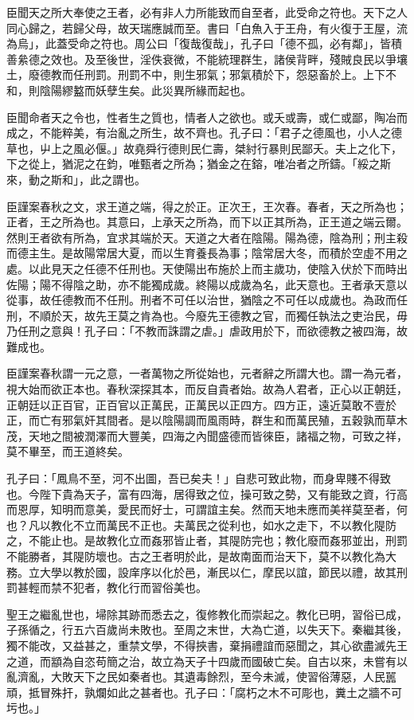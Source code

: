 \begin{pinyinscope}
臣聞天之所大奉使之王者，必有非人力所能致而自至者，此受命之符也。天下之人同心歸之，若歸父母，故天瑞應誠而至。書曰「白魚入于王舟，有火復于王屋，流為烏」，此蓋受命之符也。周公曰「復哉復哉」，孔子曰「德不孤，必有鄰」，皆積善絫德之效也。及至後世，淫佚衰微，不能統理群生，諸侯背畔，殘賊良民以爭壤土，廢德教而任刑罰。刑罰不中，則生邪氣；邪氣積於下，怨惡畜於上。上下不和，則陰陽繆盭而妖孽生矣。此災異所緣而起也。

臣聞命者天之令也，性者生之質也，情者人之欲也。或夭或壽，或仁或鄙，陶冶而成之，不能粹美，有治亂之所生，故不齊也。孔子曰：「君子之德風也，小人之德草也，屮上之風必偃。」故堯舜行德則民仁壽，桀紂行暴則民鄙夭。夫上之化下，下之從上，猶泥之在鈞，唯甄者之所為；猶金之在鎔，唯冶者之所鑄。「綏之斯來，動之斯和」，此之謂也。

臣謹案春秋之文，求王道之端，得之於正。正次王，王次春。春者，天之所為也；正者，王之所為也。其意曰，上承天之所為，而下以正其所為，正王道之端云爾。然則王者欲有所為，宜求其端於天。天道之大者在陰陽。陽為德，陰為刑；刑主殺而德主生。是故陽常居大夏，而以生育養長為事；陰常居大冬，而積於空虛不用之處。以此見天之任德不任刑也。天使陽出布施於上而主歲功，使陰入伏於下而時出佐陽；陽不得陰之助，亦不能獨成歲。終陽以成歲為名，此天意也。王者承天意以從事，故任德教而不任刑。刑者不可任以治世，猶陰之不可任以成歲也。為政而任刑，不順於天，故先王莫之肯為也。今廢先王德教之官，而獨任執法之吏治民，毋乃任刑之意與！孔子曰：「不教而誅謂之虐。」虐政用於下，而欲德教之被四海，故難成也。

臣謹案春秋謂一元之意，一者萬物之所從始也，元者辭之所謂大也。謂一為元者，視大始而欲正本也。春秋深探其本，而反自貴者始。故為人君者，正心以正朝廷，正朝廷以正百官，正百官以正萬民，正萬民以正四方。四方正，遠近莫敢不壹於正，而亡有邪氣奸其間者。是以陰陽調而風雨時，群生和而萬民殖，五穀孰而草木茂，天地之間被潤澤而大豐美，四海之內聞盛德而皆徠臣，諸福之物，可致之祥，莫不畢至，而王道終矣。

孔子曰：「鳳鳥不至，河不出圖，吾已矣夫！」自悲可致此物，而身卑賤不得致也。今陛下貴為天子，富有四海，居得致之位，操可致之勢，又有能致之資，行高而恩厚，知明而意美，愛民而好士，可謂誼主矣。然而天地未應而美祥莫至者，何也？凡以教化不立而萬民不正也。夫萬民之從利也，如水之走下，不以教化隄防之，不能止也。是故教化立而姦邪皆止者，其隄防完也；教化廢而姦邪並出，刑罰不能勝者，其隄防壞也。古之王者明於此，是故南面而治天下，莫不以教化為大務。立大學以教於國，設庠序以化於邑，漸民以仁，摩民以誼，節民以禮，故其刑罰甚輕而禁不犯者，教化行而習俗美也。

聖王之繼亂世也，埽除其跡而悉去之，復修教化而崇起之。教化已明，習俗已成，子孫循之，行五六百歲尚未敗也。至周之末世，大為亡道，以失天下。秦繼其後，獨不能改，又益甚之，重禁文學，不得挾書，棄捐禮誼而惡聞之，其心欲盡滅先王之道，而顓為自恣苟簡之治，故立為天子十四歲而國破亡矣。自古以來，未嘗有以亂濟亂，大敗天下之民如秦者也。其遺毒餘烈，至今未滅，使習俗薄惡，人民嚚頑，抵冒殊扞，孰爛如此之甚者也。孔子曰：「腐朽之木不可彫也，糞土之牆不可圬也。」


\end{pinyinscope}
